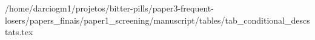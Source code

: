 /home/darciogm1/projetos/bitter-pills/paper3-frequent-losers/papers_finais/paper1_screening/manuscript/tables/tab_conditional_descstats.tex